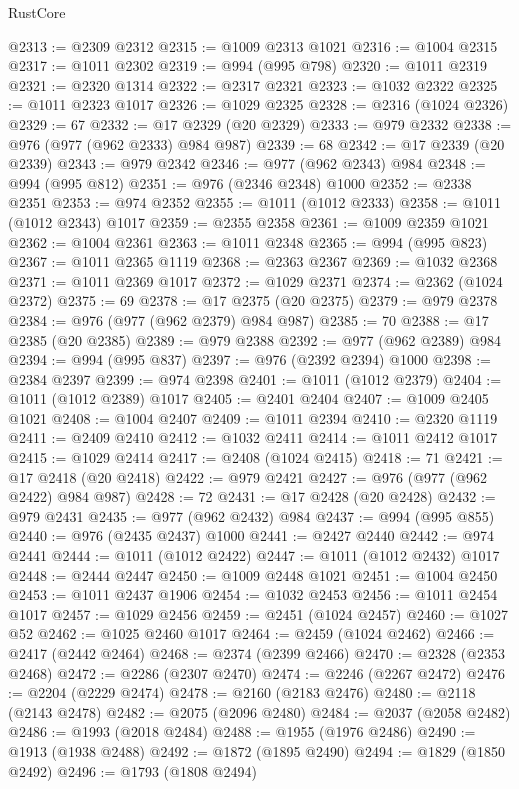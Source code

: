 \begin{lexlean}{RustCore}
\begin{coremodule}
@2313 := @2309 @2312
@2315 := @1009 @2313 @1021
@2316 := @1004 @2315
@2317 := @1011 @2302
@2319 := @994 (@995 @798)
@2320 := @1011 @2319
@2321 := @2320 @1314
@2322 := @2317 @2321
@2323 := @1032 @2322
@2325 := @1011 @2323 @1017
@2326 := @1029 @2325
@2328 := @2316 (@1024 @2326)
@2329 := 67
@2332 := @17 @2329 (@20 @2329)
@2333 := @979 @2332
@2338 := @976 (@977 (@962 @2333) @984 @987)
@2339 := 68
@2342 := @17 @2339 (@20 @2339)
@2343 := @979 @2342
@2346 := @977 (@962 @2343) @984
@2348 := @994 (@995 @812)
@2351 := @976 (@2346 @2348) @1000
@2352 := @2338 @2351
@2353 := @974 @2352
@2355 := @1011 (@1012 @2333)
@2358 := @1011 (@1012 @2343) @1017
@2359 := @2355 @2358
@2361 := @1009 @2359 @1021
@2362 := @1004 @2361
@2363 := @1011 @2348
@2365 := @994 (@995 @823)
@2367 := @1011 @2365 @1119
@2368 := @2363 @2367
@2369 := @1032 @2368
@2371 := @1011 @2369 @1017
@2372 := @1029 @2371
@2374 := @2362 (@1024 @2372)
@2375 := 69
@2378 := @17 @2375 (@20 @2375)
@2379 := @979 @2378
@2384 := @976 (@977 (@962 @2379) @984 @987)
@2385 := 70
@2388 := @17 @2385 (@20 @2385)
@2389 := @979 @2388
@2392 := @977 (@962 @2389) @984
@2394 := @994 (@995 @837)
@2397 := @976 (@2392 @2394) @1000
@2398 := @2384 @2397
@2399 := @974 @2398
@2401 := @1011 (@1012 @2379)
@2404 := @1011 (@1012 @2389) @1017
@2405 := @2401 @2404
@2407 := @1009 @2405 @1021
@2408 := @1004 @2407
@2409 := @1011 @2394
@2410 := @2320 @1119
@2411 := @2409 @2410
@2412 := @1032 @2411
@2414 := @1011 @2412 @1017
@2415 := @1029 @2414
@2417 := @2408 (@1024 @2415)
@2418 := 71
@2421 := @17 @2418 (@20 @2418)
@2422 := @979 @2421
@2427 := @976 (@977 (@962 @2422) @984 @987)
@2428 := 72
@2431 := @17 @2428 (@20 @2428)
@2432 := @979 @2431
@2435 := @977 (@962 @2432) @984
@2437 := @994 (@995 @855)
@2440 := @976 (@2435 @2437) @1000
@2441 := @2427 @2440
@2442 := @974 @2441
@2444 := @1011 (@1012 @2422)
@2447 := @1011 (@1012 @2432) @1017
@2448 := @2444 @2447
@2450 := @1009 @2448 @1021
@2451 := @1004 @2450
@2453 := @1011 @2437 @1906
@2454 := @1032 @2453
@2456 := @1011 @2454 @1017
@2457 := @1029 @2456
@2459 := @2451 (@1024 @2457)
@2460 := @1027 @52
@2462 := @1025 @2460 @1017
@2464 := @2459 (@1024 @2462)
@2466 := @2417 (@2442 @2464)
@2468 := @2374 (@2399 @2466)
@2470 := @2328 (@2353 @2468)
@2472 := @2286 (@2307 @2470)
@2474 := @2246 (@2267 @2472)
@2476 := @2204 (@2229 @2474)
@2478 := @2160 (@2183 @2476)
@2480 := @2118 (@2143 @2478)
@2482 := @2075 (@2096 @2480)
@2484 := @2037 (@2058 @2482)
@2486 := @1993 (@2018 @2484)
@2488 := @1955 (@1976 @2486)
@2490 := @1913 (@1938 @2488)
@2492 := @1872 (@1895 @2490)
@2494 := @1829 (@1850 @2492)
@2496 := @1793 (@1808 @2494)

\end{coremodule}
\end{lexlean}

